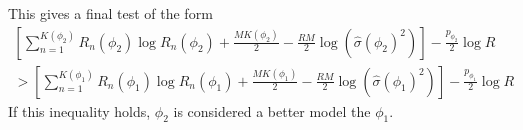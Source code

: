 \documentclass[letterpaper]{article}
\begin{document}
This gives a final test of the form
\begin{multline}
  \label{eq:18}
  \left[ \sum_{n=1}^{K(\phi_2)} R_n(\phi_2) \log R_n(\phi_2) + \frac{M K(\phi_2)}{2} - \frac{RM}{2} \log \left( \hat{\sigma}(\phi_2)^2 \right) \right] - \frac{p_{\phi_2}}{2} \log R \\
   > \left[ \sum_{n=1}^{K(\phi_1)} R_n(\phi_1) \log R_n(\phi_1) + \frac{M K(\phi_1)}{2} - \frac{RM}{2} \log \left( \hat{\sigma}(\phi_1)^2 \right) \right] - \frac{p_{\phi_1}}{2} \log R
\end{multline}
%
If this inequality holds, $\phi_2$ is considered a better model the $\phi_1$.

{}

\end{document}
